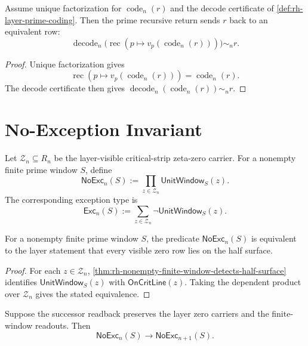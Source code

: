 \begin{theorem}
\label{thm:rh-prime-recursive-return-closes}
Assume unique factorization for $\operatorname{code}_n(r)$ and the
decode certificate of \autoref{def:rh-layer-prime-coding}. Then the prime
recursive return sends $r$ back to an equivalent row:
$$
\operatorname{decode}_n
\bigl(
\operatorname{rec}(p\mapsto v_p(\operatorname{code}_n(r)))
\bigr)
\sim_n r.
$$
\end{theorem}

\begin{proof}
Unique factorization gives
$$
\operatorname{rec}(p\mapsto v_p(\operatorname{code}_n(r)))
=
\operatorname{code}_n(r).
$$
The decode certificate then gives
$\operatorname{decode}_n(\operatorname{code}_n(r))\sim_n r$.
\end{proof}

\section{No-Exception Invariant}
\label{sec:rh-prime-window-no-exception-invariant}

\begin{definition}
\label{def:rh-layer-window-no-exception}
Let $\mathcal Z_n\subseteq R_n$ be the layer-visible critical-strip
zeta-zero carrier. For a nonempty finite prime window $S$, define
$$
\mathsf{NoExc}_{n}(S)
:=
\prod_{z\in\mathcal Z_n}\mathsf{UnitWindow}_{S}(z).
$$
The corresponding exception type is
$$
\mathsf{Exc}_{n}(S)
:=
\sum_{z\in\mathcal Z_n}\neg\mathsf{UnitWindow}_{S}(z).
$$
\end{definition}

\begin{theorem}
\label{thm:rh-window-no-exception-layer-rh}
For a nonempty finite prime window $S$, the predicate
$\mathsf{NoExc}_{n}(S)$ is equivalent to the layer statement that every
visible zero row lies on the half surface.
\end{theorem}

\begin{proof}
For each $z\in\mathcal Z_n$,
\autoref{thm:rh-nonempty-finite-window-detects-half-surface} identifies
$\mathsf{UnitWindow}_{S}(z)$ with $\mathsf{OnCritLine}(z)$. Taking the
dependent product over $\mathcal Z_n$ gives the stated equivalence.
\end{proof}

\begin{theorem}
\label{thm:rh-no-exception-inheritance}
Suppose the successor readback preserves the layer zero carriers and the
finite-window readouts. Then
$$
\mathsf{NoExc}_{n}(S)\to\mathsf{NoExc}_{n+1}(S).
$$
\end{theorem}

